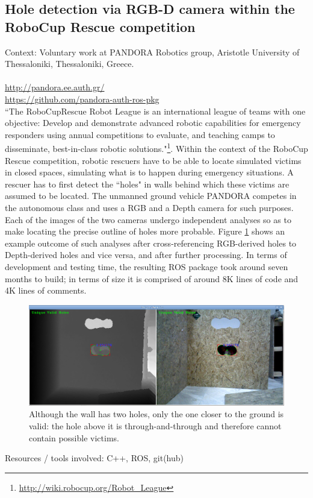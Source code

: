 \subsection{Hole detection via RGB-D camera within the RoboCup Rescue competition}

Context: Voluntary work at PANDORA Robotics group, Aristotle University of
Thessaloniki, Thessaloniki, Greece.\\\\
\url{http://pandora.ee.auth.gr/}\\
\url{https://github.com/pandora-auth-ros-pkg}\\

``The RoboCupRescue Robot League is an international league of teams with one
objective: Develop and demonstrate advanced robotic capabilities for emergency
responders using annual competitions to evaluate, and teaching camps to
disseminate, best-in-class robotic solutions."\footnote{\url{http://wiki.robocup.org/Robot_League}}.
Within the context of the RoboCup Rescue competition, robotic rescuers have to
be able to locate simulated victims in closed spaces, simulating what is to
happen during emergency situations. A rescuer has to first detect the
``holes" in walls behind which these victims are assumed to be located. The
unmanned ground vehicle PANDORA competes in the autonomous class and uses a
RGB and a Depth camera for such purposes. Each of the images of the two cameras
undergo independent analyses so as to make locating the precise outline of holes
more probable. Figure \ref{fig:holes} shows an example outcome of such analyses
after cross-referencing RGB-derived holes to Depth-derived holes and vice versa,
and after further processing. In terms of development and testing time, the
resulting ROS package took around seven months to build; in terms of size it is
comprised of around 8K lines of code and 4K lines of comments.


\begin{figure}[H]\centering
  \includegraphics[scale=0.35]{images/unique_holes.png}
  \caption{Although the wall has two holes, only the one closer to the ground
    is valid: the hole above it is through-and-through and therefore cannot
    contain possible victims.}
  \label{fig:holes}
\end{figure}


Resources / tools involved: C++, ROS, git(hub)
